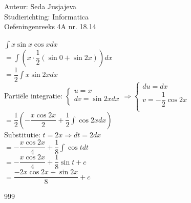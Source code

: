 \documentclass[a4paper]{article}
\newcommand{\integral}{\displaystyle\int}
\begin{document}
\noindent \large Auteur: Seda Jusjajeva\\
\noindent \large Studierichting: Informatica\\
\noindent \large Oefeningenreeks 4A nr. 18.14 \\

\medskip

\normalsize


$\integral x\sin x\cos xdx$ \\

$= \integral\left(x\cdot\dfrac{1}{2}\left(\sin 0 + \sin 2x\right)\right)dx$ \\

$= \dfrac{1}{2}\integral x\sin 2xdx$ \\

Partiële integratie: $\left\{\begin{array}{l}
    u = x \\ 
    dv = \sin 2xdx \\
\end{array}\right. \Rightarrow\left\{\begin{array}{l}
    du = dx \\
    v = -\dfrac{1}{2}\cos 2x \\
\end{array}\right.$ \\

$= \dfrac{1}{2}\left(-\dfrac{x\cos 2x}{2} + \dfrac{1}{2}\integral\cos 2xdx\right)$ \\

Substitutie: $t = 2x \Rightarrow dt = 2dx$ \\

$= -\dfrac{x\cos 2x}{4} + \dfrac{1}{8}\integral\cos tdt$ \\

$= -\dfrac{x\cos 2x}{4} + \dfrac{1}{8}\sin t + c$ \\

$= \dfrac{-2x\cos 2x + \sin 2x}{8} + c$ \\


\begin{thebibliography}{999}
\end{thebibliography}
\end{document}
